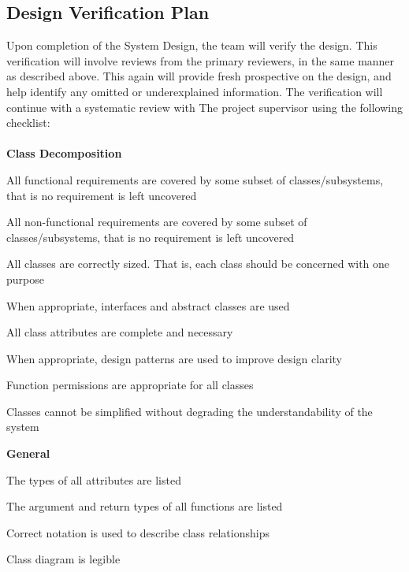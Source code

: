 \documentclass[12pt, titlepage]{article}
\begin{document}


\subsection{Design Verification Plan}
Upon completion of the System Design, the team will verify the design. This verification will involve reviews from the primary reviewers, in the same manner as described above.
This again will provide fresh prospective on the design, and help identify any omitted or underexplained information. The verification will continue with a systematic review with The
project supervisor using the following checklist:\\\\

\textbf{Class Decomposition}\\
\begin{todolist}
  \item All functional requirements are covered by some subset of classes/subsystems, that is no requirement is left uncovered
  \item All non-functional requirements are covered by some subset of classes/subsystems, that is no requirement is left uncovered
  \item All classes are correctly sized. That is, each class should be concerned with one purpose
  \item When appropriate, interfaces and abstract classes are used
  \item All class attributes are complete and necessary
  \item When appropriate, design patterns are used to improve design clarity
  \item Function permissions are appropriate for all classes
  \item Classes cannot be simplified without degrading the understandability of the system
  \end{todolist}
  \textbf{General}\\
\begin{todolist}
  \item The types of all attributes are listed
  \item The argument and return types of all functions are listed
  \item Correct notation is used to describe class relationships
  \item Class diagram is legible
  \end{todolist}
\end{document}
